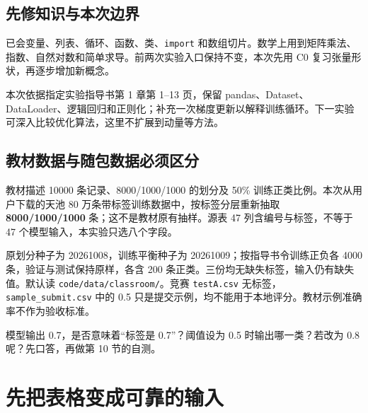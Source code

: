 \documentclass[UTF8,a4paper,11pt,fontset=fandol]{ctexart}
\newcommand{\file}[1]{\nolinkurl{#1}}
\begin{document}
\subsection{先修知识与本次边界}
已会变量、列表、循环、函数、类、\texttt{import} 和数组切片。数学上用到矩阵乘法、指数、自然对数和简单求导。前两次实验入口保持不变，本次先用 C0 复习张量形状，再逐步增加新概念。

本次依据指定实验指导书第 1 章第 1--13 页，保留 pandas、Dataset、DataLoader、逻辑回归和正则化；补充一次梯度更新以解释训练循环。下一实验可深入比较优化算法，这里不扩展到动量等方法。
\subsection{教材数据与随包数据必须区分}
教材描述 10000 条记录、8000/1000/1000 的划分及 50\% 训练正类比例。本次从用户下载的天池 80 万条带标签训练数据中，按标签分层重新抽取 \textbf{8000/1000/1000} 条；这不是教材原有抽样。源表 47 列含编号与标签，不等于 47 个模型输入，本实验只选八个字段。

原划分种子为 20261008，训练平衡种子为 20261009；按指导书令训练正负各 4000 条，验证与测试保持原样，各含 200 条正类。三份均无缺失标签，输入仍有缺失值。默认读 \file{code/data/classroom/}。竞赛 \file{testA.csv} 无标签，\file{sample_submit.csv} 中的 0.5 只是提交示例，均不能用于本地评分。教材示例准确率不作为验收标准。
\begin{questionbox}
模型输出 0.7，是否意味着“标签是 0.7”？阈值设为 0.5 时输出哪一类？若改为 0.8 呢？先口答，再做第 10 节的自测。
\end{questionbox}
\clearpage
\section{先把表格变成可靠的输入}
\end{document}
